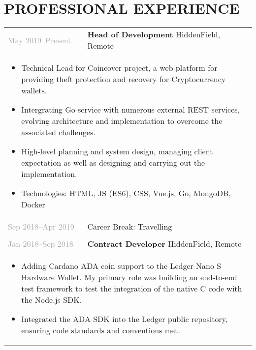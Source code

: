 \documentclass{article}
\newenvironment{exptable}{
  \begin{longtable}{lp{0.8\textwidth}}
  }{
  \end{longtable}
}
\begin{document}
  \section*{PROFESSIONAL EXPERIENCE}
    \begin{exptable}
      \textcolor{darkgray}{May 2019--Present}  & \textbf{Head of Development} HiddenField, Remote \\
      \multicolumn{2}{p{\textwidth}}{
        \begin{itemize}
          \item Technical Lead for Coincover project, a web platform for providing theft protection and recovery for Cryptocurrency wallets.
          \item Intergrating Go service with numerous external REST services, evolving architecture and implementation to overcome the associated challenges.
          \item High-level planning and system design, managing client expectation as well as designing and carrying out the implementation.
        \end{itemize}

        \vspace{1em}

        \begin{itemize}[leftmargin=1em]
          \item[] Technologies: HTML, JS (ES6), CSS, Vue.js, Go, MongoDB, Docker
        \end{itemize}
      } \\

      \textcolor{darkgray}{Sep 2018--Apr 2019} & Career Break: Travelling \\
      \multicolumn{2}{p{\textwidth}}{} \\

      \textcolor{darkgray}{Jan 2018--Sep 2018} & \textbf{Contract Developer} HiddenField, Remote \\
      \multicolumn{2}{p{\textwidth}}{
        \begin{itemize}
          \item Adding Cardano ADA coin support to the Ledger Nano S Hardware Wallet. My primary role was building an end-to-end test framework to test the integration of the native C code with the Node.js SDK.
          \item Integrated the ADA SDK into the Ledger public repository, ensuring code standards and conventions met.
        \end{itemize}

}
\end{exptable}
\end{document}
